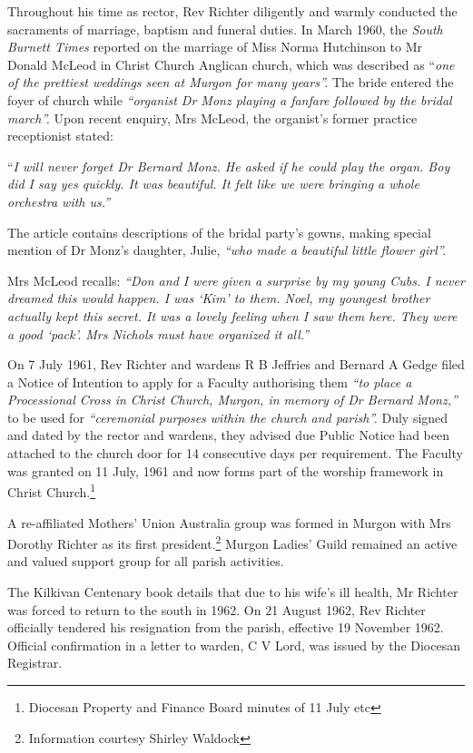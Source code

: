 Throughout his time as rector, Rev Richter diligently and warmly conducted the sacraments of marriage, baptism and funeral duties. In March 1960, the \emph{South Burnett Times} reported on the marriage of Miss Norma Hutchinson to Mr Donald McLeod in Christ Church Anglican church, which was described as ``\emph{one of the prettiest weddings seen at Murgon for many years''.} The bride entered the foyer of church while \emph{``organist Dr Monz playing a fanfare followed by the bridal march''.} Upon recent enquiry, Mrs McLeod, the organist's former practice receptionist stated:



``\emph{I will never forget Dr Bernard Monz. He asked if he could play the organ. Boy did I say yes quickly. It was beautiful. It felt like we were bringing a whole orchestra with us.''}



The article contains descriptions of the bridal party's gowns, making special mention of Dr Monz's daughter, Julie, \emph{``who made a beautiful little flower girl''.}



Mrs McLeod recalls: \emph{``Don and I were given a surprise by my young Cubs. I never dreamed this would happen. I was `Kim' to them. Noel, my youngest brother actually kept this secret. It was a lovely feeling when I saw them here. They were a good `pack'. Mrs Nichols must have organized it all.''}



On 7 July 1961, Rev Richter and wardens R B Jeffries and Bernard A Gedge filed a Notice of Intention to apply for a Faculty authorising them \emph{``to place a Processional Cross in Christ Church, Murgon, in memory of Dr Bernard Monz,''} to be used for \emph{``ceremonial purposes within the church and parish''.} Duly signed and dated by the rector and wardens, they advised due Public Notice had been attached to the church door for 14 consecutive days per requirement. The Faculty was granted on 11 July, 1961 and now forms part of the worship framework in Christ Church.\footnote{Diocesan Property and Finance Board minutes of 11 July etc}


A re-affiliated Mothers' Union Australia group was formed in Murgon with Mrs Dorothy Richter as its first president.\footnote{Information courtesy Shirley Waldock} Murgon Ladies' Guild remained an active and valued support group for all parish activities.


The Kilkivan Centenary book details that due to his wife's ill health, Mr Richter was forced to return to the south in 1962. On 21 August 1962, Rev Richter officially tendered his resignation from the parish, effective 19 November 1962. Official confirmation in a letter to warden, C V Lord, was issued by the Diocesan Registrar.



